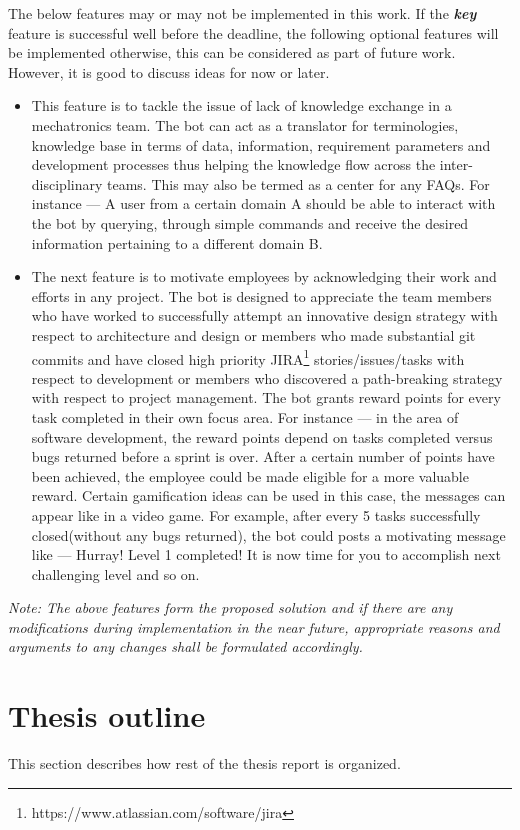 The below features may or may not be implemented in this work. If the \textbf{\textit{key}} feature is successful well before the deadline, the following optional features will be implemented otherwise, this can be considered as part of future work. However, it is good to discuss ideas for now or later.
\begin{itemize}
\item This feature is to tackle the issue of lack of knowledge exchange in a mechatronics team. The bot can act as a translator for terminologies, knowledge base in terms of data, information, requirement parameters and development processes thus helping
the knowledge flow across the inter-disciplinary teams. This may also be termed as a center for any FAQs. For instance — A user from a certain domain A should be able to interact with the bot by querying, through simple commands and receive the desired information pertaining to a different domain B.

\item The next feature is to motivate employees by acknowledging their work and efforts in any project. The bot is designed to appreciate the team members who have worked to successfully attempt an innovative design strategy with respect to architecture and design or members who made substantial git commits and have closed high priority JIRA\footnote{https://www.atlassian.com/software/jira} stories/issues/tasks with respect to development or members who discovered a path-breaking strategy with respect to project management. The bot grants reward points for every task completed in their own focus area. For instance --- in the area of software development, the reward points depend on tasks completed versus bugs returned before a sprint is over. After a certain number of points have been achieved, the employee could be made eligible for a more valuable reward. Certain gamification ideas can be used in this case, the messages can appear like in a video game. For example, after every 5 tasks successfully closed(without any bugs returned), the bot could posts a motivating message like — Hurray! Level 1 completed! It is now time for you to accomplish next challenging level and so on.
\end{itemize} 


\textit{Note: The above features form the proposed solution and if there are any modifications during implementation in the near future, appropriate reasons and arguments to any changes shall be formulated accordingly.}

\section{Thesis outline} This section describes how rest of the thesis report is organized.

